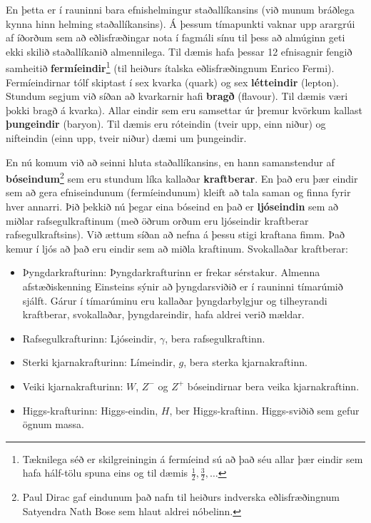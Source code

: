 \ifdefined \wholebook \else\documentclass[oneside]{book}\usepackage{EdlBook}\graphicspath{{figures/}}
\begin{document}
En þetta er í rauninni bara efnishelmingur staðallíkansins (við munum bráðlega kynna hinn helming staðallíkansins). Á þessum tímapunkti vaknar upp arargrúi af íðorðum sem að eðlisfræðingar nota í fagmáli sínu til þess að almúginn geti ekki skilið staðallíkanið almennilega. Til dæmis hafa þessar 12 efnisagnir fengið samheitið \textbf{fermíeindir}\footnote{Tæknilega séð er skilgreiningin á fermíeind sú að það séu allar þær eindir sem hafa hálf-tölu spuna eins og til dæmis $\frac{1}{2}, \frac{3}{2}, \ldots$} (til heiðurs ítalska eðlisfræðingnum Enrico Fermi). Fermíeindirnar tólf skiptast í sex kvarka (quark) og sex \textbf{létteindir} (lepton). Stundum segjum við síðan að kvarkarnir hafi \textbf{bragð} (flavour). Til dæmis væri þokki bragð á kvarka). Allar eindir sem eru samsettar úr þremur kvörkum kallast \textbf{þungeindir} (baryon). Til dæmis eru róteindin (tveir upp, einn niður) og nifteindin (einn upp, tveir niður) dæmi um þungeindir.

\newpage

En nú komum við að seinni hluta staðallíkansins, en hann samanstendur af \textbf{bóseindum}\footnote{Paul Dirac gaf eindunum það nafn til heiðurs indverska eðlisfræðingnum Satyendra Nath Bose sem hlaut aldrei nóbelinn.} sem eru stundum líka kallaðar \textbf{kraftberar}. En það eru þær eindir sem að gera efniseindunum (fermíeindunum) kleift að tala saman og finna fyrir hver annarri. Þið þekkið nú þegar eina bóseind en það er \textbf{ljóseindin} sem að miðlar rafsegulkraftinum (með öðrum orðum eru ljóseindir kraftberar rafsegulkraftsins). Við ættum síðan að nefna á þessu stigi kraftana fimm. Það kemur í ljós að það eru eindir sem að miðla kraftinum. Svokallaðar kraftberar:

\begin{itemize}
    \item Þyngdarkrafturinn: Þyngdarkrafturinn er frekar sérstakur. Almenna afstæðiskenning Einsteins sýnir að þyngdarsviðið er í rauninni tímarúmið sjálft. Gárur í tímarúminu eru kallaðar þyngdarbylgjur og tilheyrandi kraftberar, svokallaðar, þyngdareindir, hafa aldrei verið mældar.
    
    \item Rafsegulkrafturinn: Ljóseindir, $\gamma$, bera rafsegulkraftinn.
    
    \item Sterki kjarnakrafturinn: Límeindir, $g$, bera sterka kjarnakraftinn.
    
    \item Veiki kjarnakrafturinn: $W$, $Z^-$ og $Z^+$ bóseindirnar bera veika kjarnakraftinn.
    
    \item Higgs-krafturinn: Higgs-eindin, $H$, ber Higgs-kraftinn. Higgs-sviðið sem gefur ögnum massa.
\end{itemize}
\end{document}

